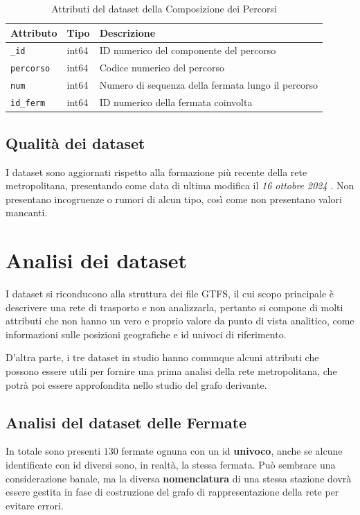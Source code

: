 \begin{table}[ht!]
\centering
\begin{tabular}{lll}
\hline
\textbf{Attributo} & \textbf{Tipo} & \textbf{Descrizione} \\
\hline
\texttt{\_id} & int64 & ID numerico del componente del percorso \\
\texttt{percorso} & int64 & Codice numerico del percorso \\
\texttt{num} & int64 & Numero di sequenza della fermata lungo il percorso \\
\texttt{id\_ferm} & int64 & ID numerico della fermata coinvolta \\
\hline
\end{tabular}
\caption{Attributi del dataset della Composizione dei Percorsi}
\label{tab:Attributi del dataset della Composizione dei Percorsi}
\end{table}

\subsection{Qualità dei dataset}
I dataset sono aggiornati rispetto alla formazione più recente della rete metropolitana, presentando come data di ultima modifica il \textit{16 ottobre 2024} \cite{FermateLineeMetropolitane}\cite{PercorsiLineeMetropolitane}\cite{ComposizionePercorsiLineeMetropolitane}. Non presentano incogruenze o rumori di alcun tipo, così come non presentano valori mancanti.

\section{Analisi dei dataset}
I dataset si riconducono alla struttura dei file GTFS, il cui scopo principale è descrivere una rete di trasporto e non analizzarla, pertanto si compone di molti attributi che non hanno un vero e proprio valore da punto di vista analitico, come informazioni sulle posizioni geografiche e id univoci di riferimento.

D'altra parte, i tre dataset in studio hanno comunque alcuni attributi che possono essere utili per fornire una prima analisi della rete metropolitana, che potrà poi essere approfondita nello studio del grafo derivante.

\subsection{Analisi del dataset delle Fermate}
\label{subsec: analisi del dataset dellef ermate}
In totale sono presenti $130$ fermate ognuna con un id \textbf{univoco}, anche se alcune identificate con id diversi sono, in realtà, la stessa fermata. Può sembrare una considerazione banale, ma la diversa \textbf{nomenclatura} di una stessa stazione dovrà essere gestita in fase di costruzione del grafo di rappresentazione della rete per evitare errori.

